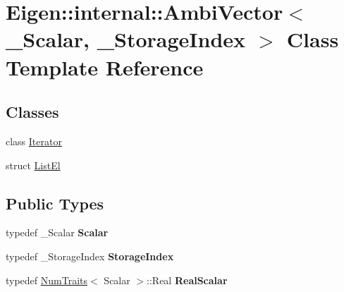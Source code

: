 \hypertarget{class_eigen_1_1internal_1_1_ambi_vector}{}\section{Eigen\+::internal\+::Ambi\+Vector$<$ \+\_\+\+Scalar, \+\_\+\+Storage\+Index $>$ Class Template Reference}
\label{class_eigen_1_1internal_1_1_ambi_vector}
\subsection*{Classes}
\begin{DoxyCompactItemize}
\item 
class \mbox{\hyperlink{class_eigen_1_1internal_1_1_ambi_vector_1_1_iterator}{Iterator}}
\item 
struct \mbox{\hyperlink{struct_eigen_1_1internal_1_1_ambi_vector_1_1_list_el}{List\+El}}
\end{DoxyCompactItemize}
\subsection*{Public Types}
\begin{DoxyCompactItemize}
\item 
\mbox{\label{class_eigen_1_1internal_1_1_ambi_vector_a6111a2001a21ebc2f5b241d8ea68c25e}} 
typedef \+\_\+\+Scalar {\bfseries Scalar}
\item 
\mbox{\label{class_eigen_1_1internal_1_1_ambi_vector_a7cfebaeb966f905edf535b546694c70f}} 
typedef \+\_\+\+Storage\+Index {\bfseries Storage\+Index}
\item 
\mbox{\label{class_eigen_1_1internal_1_1_ambi_vector_a72bf2db15936c5be139b9ffc90dc6bff}} 
typedef \mbox{\hyperlink{struct_eigen_1_1_num_traits}{Num\+Traits}}$<$ Scalar $>$\+::Real {\bfseries Real\+Scalar}
\end{DoxyCompactItemize}
